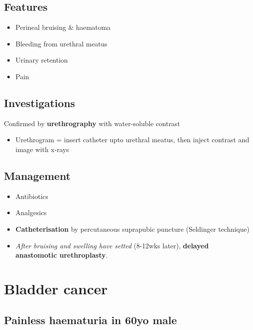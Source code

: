 \documentclass[
  14pt,
]{memoir}
\providecommand{\tightlist}{%
  \setlength{\itemsep}{0pt}\setlength{\parskip}{0pt}}
\begin{document}
\hypertarget{features-6}{%
\subsection{Features}\label{features-6}}

\begin{itemize}
\tightlist
\item
  Perineal bruising \& haematoma
\item
  Bleeding from urethral meatus
\item
  Urinary retention
\item
  Pain
\end{itemize}

\hypertarget{investigations-5}{%
\subsection{Investigations}\label{investigations-5}}

Confirmed by \textbf{urethrography} with water-soluble contrast

\begin{itemize}
\tightlist
\item
  Urethrogram = insert catheter upto urethral meatus, then inject
  contrast and image with x-rays
\end{itemize}

\hypertarget{management}{%
\subsection{Management}\label{management}}

\begin{itemize}
\tightlist
\item
  Antibiotics
\item
  Analgesics
\item
  \textbf{Catheterisation} by percutaneous suprapubic puncture
  (Seldinger technique)
\item
  \emph{After bruising and swelling have setted} (8-12wks later),
  \textbf{delayed anastomotic urethroplasty}.
\end{itemize}

\pagebreak

\hypertarget{bladder-cancer}{%
\section{Bladder cancer}\label{bladder-cancer}}

\hypertarget{painless-haematuria-in-60yo-male}{%
\subsection{Painless haematuria in 60yo
male}\label{painless-haematuria-in-60yo-male}}
\end{document}
